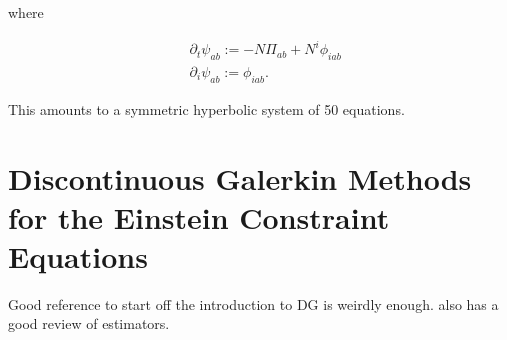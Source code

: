 \documentclass{ut-thesis}
\begin{document}
where

\begin{align}
  &\partial_t\psi_{ab} := - N\Pi_{ab} + N^i\phi_{iab} \\
  &\partial_i\psi_{ab} := \phi_{iab}.
\end{align}

This amounts to a symmetric hyperbolic system of 50 equations.

\section{Discontinuous Galerkin Methods for the Einstein Constraint Equations}

Good reference to start off the introduction to DG is \cite{stiller2016robust} weirdly enough.
\cite{bi2015posteriori} also has a good review of estimators.











\end{document}
